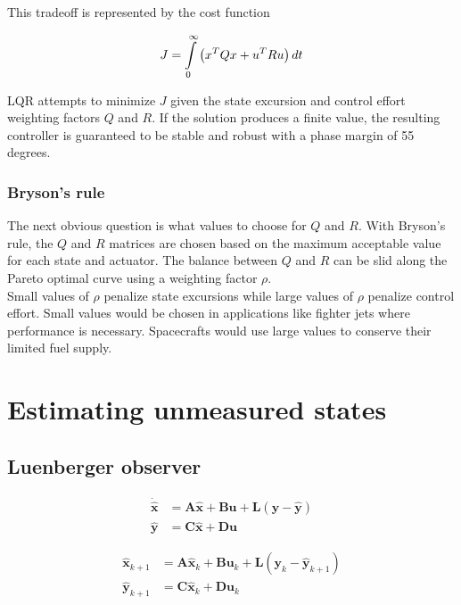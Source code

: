\documentclass[10pt,conference,compsoc]{IEEEtran}
\newcommand{\mtx}[1] {\bm #1}
\begin{document}
This tradeoff is represented by the cost function

\begin{equation*}
  J = \int\limits_0^\infty \left(x^T Q x + u^T R u \right) dt \\
\end{equation*}

LQR attempts to minimize $J$ given the \gls{state} excursion and control effort
weighting factors $Q$ and $R$. If the solution produces a finite value, the
resulting controller is guaranteed to be stable and robust with a phase margin
of 55 degrees.

\subsubsection{Bryson's rule}

The next obvious question is what values to choose for $Q$ and $R$. With
Bryson's rule, the $Q$ and $R$ matrices are chosen based on the maximum
acceptable value for each \gls{state} and actuator. The balance between $Q$ and
$R$ can be slid along the Pareto optimal curve using a weighting factor $\rho$.
\\

Small values of $\rho$ penalize \gls{state} excursions while large values of
$\rho$ penalize control effort. Small values would be chosen in applications
like fighter jets where performance is necessary. Spacecrafts would use large
values to conserve their limited fuel supply.

\section{Estimating unmeasured states}

\subsection{Luenberger observer}

\begin{align}
  \dot{\hat{\mtx{x}}} &= \mtx{A}\hat{\mtx{x}} + \mtx{B}\mtx{u} +
    \mtx{L} (\mtx{y} - \hat{\mtx{y}}) \label{eq:s_obsv_x} \\
  \hat{\mtx{y}} &= \mtx{C}\hat{\mtx{x}} + \mtx{D}\mtx{u} \label{eq:s_obsv_y}
\end{align}

\begin{align}
  \hat{\mtx{x}}_{k+1} &= \mtx{A}\hat{\mtx{x}}_k + \mtx{B}\mtx{u}_k +
    \mtx{L} (\mtx{y}_k - \hat{\mtx{y}}_{k+1}) \label{eq:z_obsv_x} \\
  \hat{\mtx{y}}_{k+1} &= \mtx{C}\hat{\mtx{x}}_k +
    \mtx{D}\mtx{u}_k \label{eq:z_obsv_y} \\ \nonumber
\end{align}
\end{document}
